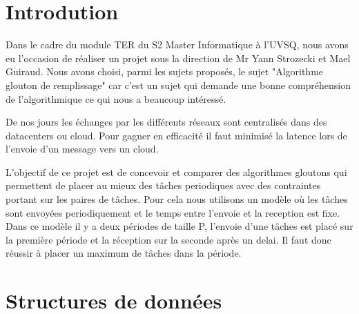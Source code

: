 \documentclass[11pt]{article}
\title{\vspace{13em}{\huge TER}}
\author{Rémi Navarro - 21401257\\ Edouard Fouassier - 21400750}
\begin{document}
\clearpage
\maketitle\vspace{13em}
\newpage
\tableofcontents
\newpage
\clearpage
{}

\section{Introdution}
Dans le cadre du module TER du S2 Master Informatique à l’UVSQ, nous avons eu l’occasion de réaliser un projet sous la direction de Mr Yann Strozecki et Mael Guiraud.
Nous avons choisi, parmi les sujets proposés, le sujet "Algorithme glouton de remplissage" car c'est un sujet qui demande une bonne compréhension de l'algorithmique ce qui nous a beaucoup intéressé.

De nos jours les échanges par les différents réseaux sont centralisés dans des datacenters ou cloud.
Pour gagner en efficacité il faut minimisé la latence lors de l'envoie d'un message vers un cloud.

L'objectif de ce projet est de concevoir et comparer des algorithmes gloutons qui permettent de placer au mieux des tâches periodiques avec des contraintes portant sur les paires de tâches.
Pour cela nous utilisons un modèle où les tâches sont envoyées periodiquement et le temps entre l'envoie et la reception est fixe.
Dans ce modèle il y a deux périodes de taille P, l'envoie d'une tâches est placé sur la première période et la réception sur la seconde après un delai.
Il faut donc réussir à placer un maximum de tâches dans la période.

\section{Structures de données}
\end{document}

